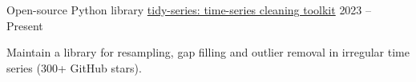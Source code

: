 \cventry
  {Open-source Python library}                %
  {\href{https://github.com/your-username/tidy-series}{tidy-series: time-series cleaning toolkit}}
  {}                                          %
  {2023 -- Present}                           %
  {
    \begin{cvitems}
      \item {Maintain a library for resampling, gap filling and outlier
      removal in irregular time series (300+ GitHub stars).}
    \end{cvitems}
  }
